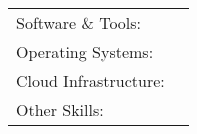 \vspace{-3mm}
\begin{cventries}
	\cventry
	{}
	{\def\arraystretch{1.15}{\begin{tabular}{ l l }
				Software \& Tools:    & {\skill{ Python, Spark/PySpark, MySQL, Redis, Tensorflow, PyTorch, ONNX}}                             \\
				Operating Systems:    & {\skill{ Windows, Ubuntu Server, Arch Linux, macOS}}                                                  \\
				Cloud Infrastructure: & {\skill{ Microsoft Azure, Amazon AWS}}                                                                \\
				Other Skills:         & {\skill{ Data Processing \& Analysis, Stochastic Modeling, Reverse Engineering, Penetration Testing}} \\
			\end{tabular}}}
	{}
	{}
	{}
\end{cventries}

\vspace{-10mm}